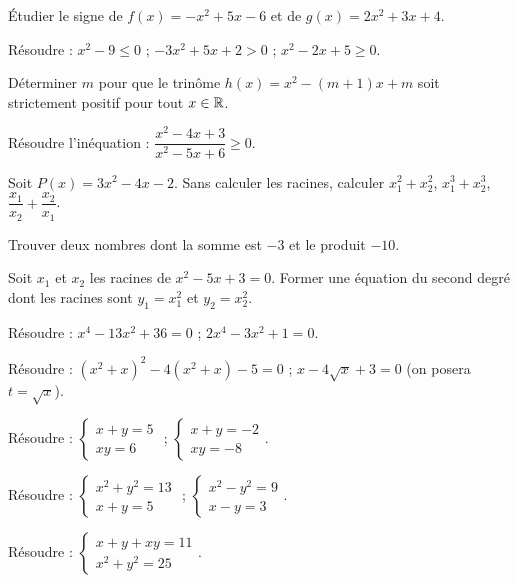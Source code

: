 \exo{}
Étudier le signe de $f(x) = -x^2 + 5x - 6$ et de $g(x) = 2x^2 + 3x + 4$.

\exo{}
Résoudre : $x^2 - 9 \leq 0$ ; $-3x^2 + 5x + 2 > 0$ ; $x^2 - 2x + 5 \geq 0$.

\exo{}
Déterminer $m$ pour que le trinôme $h(x) = x^2 - (m+1)x + m$ soit strictement positif pour tout $x \in \mathbb{R}$.

\exo{}
Résoudre l'inéquation : $\dfrac{x^2 - 4x + 3}{x^2 - 5x + 6} \geq 0$.


\exo{}
Soit $P(x) = 3x^2 - 4x - 2$. Sans calculer les racines, calculer $x_1^2 + x_2^2$, $x_1^3 + x_2^3$, $\dfrac{x_1}{x_2} + \dfrac{x_2}{x_1}$.

\exo{}
Trouver deux nombres dont la somme est $-3$ et le produit $-10$.

\exo{}
Soit $x_1$ et $x_2$ les racines de $x^2 - 5x + 3 = 0$. Former une équation du second degré dont les racines sont $y_1 = x_1^2$ et $y_2 = x_2^2$.


\exo{}
Résoudre : $x^4 - 13x^2 + 36 = 0$ ; $2x^4 - 3x^2 + 1 = 0$.

\exo{}
Résoudre : $(x^2 + x)^2 - 4(x^2 + x) - 5 = 0$ ; $x - 4\sqrt{x} + 3 = 0$ (on posera $t = \sqrt{x}$).


\exo{}
Résoudre : $\begin{cases} x + y = 5 \\ xy = 6 \end{cases}$ ; $\begin{cases} x + y = -2 \\ xy = -8 \end{cases}$.

\exo{}
Résoudre : $\begin{cases} x^2 + y^2 = 13 \\ x + y = 5 \end{cases}$ ; $\begin{cases} x^2 - y^2 = 9 \\ x - y = 3 \end{cases}$.

\exo{}
Résoudre : $\begin{cases} x + y + xy = 11 \\ x^2 + y^2 = 25 \end{cases}$.

